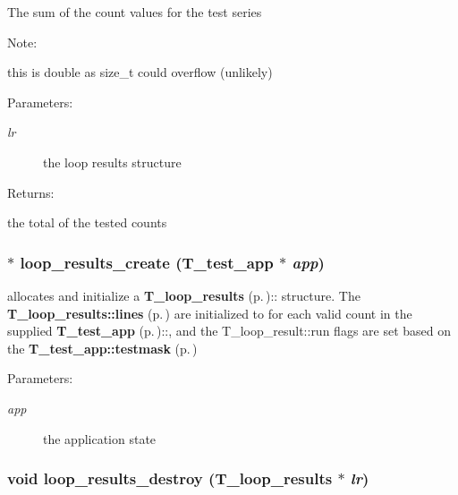 The sum of the count values for the test series \begin{Desc}
\item[Note: ]\par
this is double as size\_\-t could overflow (unlikely) \end{Desc}
\begin{Desc}
\item[Parameters: ]\par
\begin{description}
\item[{\em 
lr}]the loop results structure \end{description}
\end{Desc}
\begin{Desc}
\item[Returns: ]\par
the total of the tested counts \end{Desc}
\subsubsection{$\ast$ loop\_\-results\_\-create ({\bf T\_\-test\_\-app} $\ast$ {\em app})}\label{group__loop__test_a3}


allocates and initialize a {\bf T\_\-loop\_\-results} {\rm (p.\,\pageref{structT__loop__results})}:: structure. The {\bf T\_\-loop\_\-results::lines} {\rm (p.\,\pageref{structT__loop__results_m4})} are initialized to for each valid count in the supplied {\bf T\_\-test\_\-app} {\rm (p.\,\pageref{structT__test__app})}::, and the T\_\-loop\_\-result::run flags are set based on the {\bf T\_\-test\_\-app::testmask} {\rm (p.\,\pageref{structT__test__app_m13})}

\begin{Desc}
\item[Parameters: ]\par
\begin{description}
\item[{\em 
app}]the application state \end{description}
\end{Desc}
\subsubsection{\setlength{\rightskip}{0pt plus 5cm}void loop\_\-results\_\-destroy ({\bf T\_\-loop\_\-results} $\ast$ {\em lr})}\label{group__loop__test_a4}


